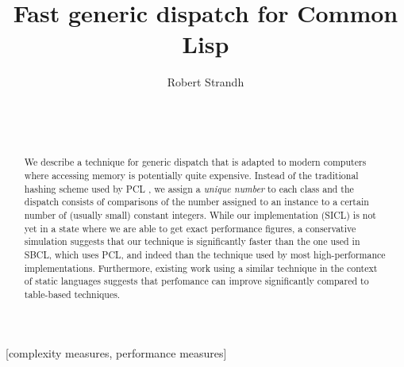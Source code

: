 \documentclass{acm_proc_article-sp}
\def\inputtex#1{}
\begin{document}
\title{Fast generic dispatch for Common Lisp}
\author{\alignauthor
Robert Strandh\\
\\
\\
\\
}

\maketitle

\begin{abstract}
We describe a technique for generic dispatch that is adapted to modern
computers where accessing memory is potentially quite expensive.
Instead of the traditional hashing scheme used by PCL
\cite{Kiczales:1990:EMD:91556.91600}, we assign a \emph{unique number}
to each class and the dispatch consists of comparisons of the number
assigned to an instance to a certain number of (usually small)
constant integers.  While our implementation (SICL) is not yet in a
state where we are able to get exact performance figures, a
conservative simulation suggests that our technique is significantly
faster than the one used in SBCL, which uses PCL, and indeed than the
technique used by most high-performance \cl{} implementations.
Furthermore, existing work \cite{Zendra:1997:EDD:263698.263728} using
a similar technique in the context of static languages suggests that
perfomance can improve significantly compared to table-based
techniques.
\end{abstract}

[complexity measures, performance measures]

\inputtex{sec-introduction.tex}
\inputtex{sec-previous.tex}
\inputtex{sec-our-method.tex}
\inputtex{sec-performance.tex}
\inputtex{sec-conclusions.tex}
\inputtex{sec-acknowledgements.tex}



\end{document}

